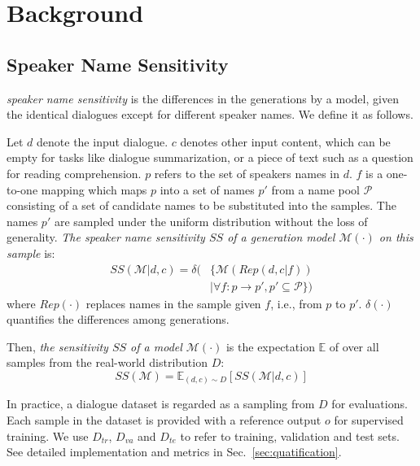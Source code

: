 \section{Background}

\subsection{Speaker Name Sensitivity}
\label{sec:problem}

\textit{speaker name sensitivity} is the differences in the generations by a model, given the 
identical dialogues except for different speaker names. We define it as follows.


Let $d$ denote the input dialogue. $c$ denotes other input content, which can be empty for tasks like dialogue summarization, or a piece of text such as a question for reading comprehension. $p$ refers to the set of speakers names in $d$. $f$ is a one-to-one mapping which maps $p$ into a set of names $p'$ from a name pool $\mathcal{P}$ consisting of a set of candidate names to be substituted into the samples. The names $p'$  are sampled under the uniform distribution without the loss of generality.
\textit{The speaker name sensitivity $SS$ of a generation model $\mathcal{M}(\cdot)$ on this sample} is:
\begin{equation}
	\label{eq:ss}
	\begin{aligned}
	SS(\mathcal{M} | d, c) = \delta(&\{\mathcal{M}(Rep(d, c | f )) \\
	&| \forall f: p\rightarrow p', p'\subseteq \mathcal{P} \})
	\end{aligned}
\end{equation}
where $Rep(\cdot)$ replaces names in the sample given $f$, i.e., from $p$ to $p'$. $\delta(\cdot)$ quantifies the differences among generations.

Then, \textit{the sensitivity $SS$ of a model $\mathcal{M}(\cdot)$} is the expectation $\mathbb{E}$ of over all samples from the real-world distribution $D$:
 \begin{equation}
 		SS(\mathcal{M}) = \mathbb{E}_{(d,c)\sim D} [ SS (\mathcal{M} | d,c) ] 
 \end{equation}

In practice, a dialogue dataset is regarded as a sampling from $D$ for evaluations.  Each sample in the dataset is provided with a reference output $o$ for supervised training. We use $D_{tr}$, $D_{va}$ and $D_{te}$ to refer to training, validation and test sets.
See detailed implementation and metrics in Sec.~\ref{sec:quatification}.



